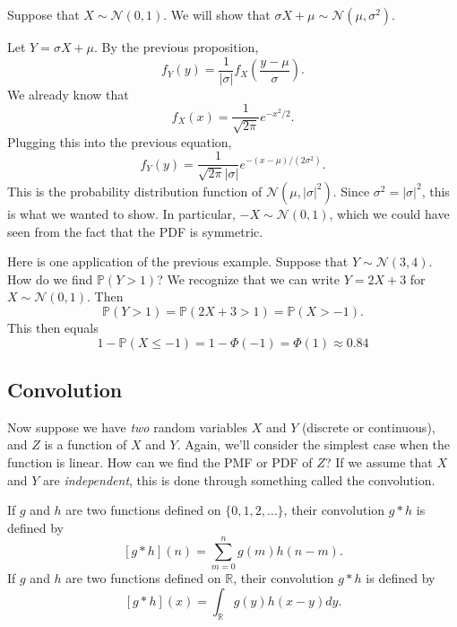 \documentclass{ximera}
\begin{document}
\begin{example}
Suppose that $X \sim \mathcal{N}(0,1)$. We will show that $\sigma X + \mu \sim \mathcal{N}(\mu,\sigma^2)$.

Let $Y=\sigma X + \mu$. By the previous proposition,
$$
f_Y(y) = \frac{1}{\vert \sigma \vert} f_X\left( \frac{y-\mu}{\sigma}\right).
$$
We already know that
$$
f_X(x) = \frac{1}{ \sqrt{ 2\pi} } e^{-x^2/2}.
$$
Plugging this into the previous equation,
$$
f_Y(y) = \frac{1}{\sqrt{ 2\pi} \vert \sigma \vert} e^{-(x-\mu)/(2\sigma^2)}. 
$$
This is the probability distribution function of $\mathcal{N}(\mu, \vert \sigma \vert^2)$. Since $\sigma^2 = \vert \sigma \vert^2$, this is what we wanted to show. In particular, $-X \sim \mathcal{N}(0,1)$, which we could have seen from the fact that the PDF is symmetric.
\end{example}

Here is one application of the previous example. Suppose that $Y \sim \mathcal{N}(3,4)$. How do we find $\mathbb{P}(Y >1)$? We recognize that we can write $Y=2X+3$ for  $X\sim \mathcal{N}(0,1)$. Then
$$
\mathbb{P}(Y>1) = \mathbb{P}(2X+3>1) = \mathbb{P}(X>-1).
$$
This then equals 
$$
1 - \mathbb{P}(X \leq -1) = 1-\Phi(-1) = \Phi(1) \approx 0.84
$$
\subsection{Convolution}

Now suppose we have \textit{two} random variables $X$ and $Y$ (discrete or continuous), and $Z$ is a function of $X$ and $Y$. Again, we'll consider the simplest case when the function is linear. How can we find the PMF or PDF of $Z$? If we assume that $X$ and $Y$ are \textit{independent}, this is done through something called the convolution.

\begin{definition}
If $g$ and $h$ are two functions defined on $\{0,1,2,\ldots\}$, their convolution $g *h$ is defined by
$$
[g*h](n) = \sum_{m=0}^{n} g(m)h(n-m).
$$
If $g$ and $h$ are two functions defined on $\mathbb{R}$, their convolution $g*h$ is defined by
$$
[g*h](x) = \int_{\mathbb{R}} g(y)h(x-y)dy.
$$
\end{definition}
\end{document}
